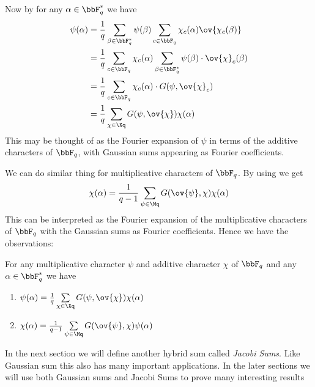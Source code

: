 Now by  for any $\alpha\in\bbF_q^*$ we have \begin{align*}
  \psi(\alpha) & =\frac1q\sum_{\beta\in \bbF_q^*}\psi(\beta)\sum_{c\in\bbF_q}\chi_{c}(\alpha)\ov{\chi_{c}(\beta)}  \\
               & =\frac1q\sum_{c\in\bbF_q}\chi_c(\alpha)\sum_{\beta\in\bbF_q^*}\psi(\beta)\cdot \ov{\chi}_c(\beta) \\
               & =\frac1q\sum_{c\in\bbF_q}\chi_c(\alpha)\cdot G(\psi,\ov{\chi}_c)                                  \\
               & =\frac1q\sum_{\chi\in\Xq}G(\psi,\ov{\chi})\chi(\alpha)
\end{align*}This may be thought of as the Fourier expansion of $\psi$ in terms of the additive characters of $\bbF_q$, with Gaussian sums appearing as Fourier coefficients. 

We can do similar thing for multiplicative characters of $\bbF_q$. By using  we get $$\chi(\alpha)=\frac1{q-1}\sum_{\psi\in\Mq}G(\ov{\psi},\chi)\chi(\alpha)$$ This can be interpreted as the Fourier expansion of the multiplicative characters of $\bbF_q$ with the Gaussian sums as Fourier coefficients. Hence we have the observations:
\begin{observation}
  For any multiplicative character $\psi$ and additive character $\chi$ of $\bbF_q$ and any  $\alpha\in\bbF_q^*$ we have \begin{enumerate}[label=(\roman*)]
    \item $\psi(\alpha)=\frac1q\sum\limits_{\chi\in \Xq}G(\psi,\ov{\chi})\chi(\alpha)$ 
    \item $\chi(\alpha)=\frac1{q-1}\sum\limits_{\psi\in\Mq}G(\ov{\psi},\chi)\psi(\alpha)$
  \end{enumerate}
\end{observation}


In the next section we will define another hybrid sum called \emph{Jacobi Sums}. Like Gaussian sum this also has many important applications. In the later sections we will use both Gaussian sums and Jacobi Sums to prove many interesting results